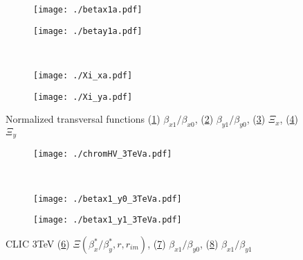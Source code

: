\begin{figure}
\begin{subfigure}{0.5\textwidth}
 \texttt{[image: ./betax1a.pdf]}\caption{}\label{figT:Bx}
 \end{subfigure}
 \begin{subfigure}{0.5\textwidth}
 \texttt{[image: ./betay1a.pdf]}\caption{}\label{figT:By}
 \end{subfigure}\\
 \begin{subfigure}{0.5\textwidth}
 \texttt{[image: ./Xi\_xa.pdf]}\caption{}\label{figT:xix}
 \end{subfigure}
 \begin{subfigure}{0.5\textwidth}
 \texttt{[image: ./Xi\_ya.pdf]}\caption{}\label{figT:xiy}
 \end{subfigure}
 \caption{Normalized transversal functions (\ref{figT:Bx}) $\beta_{x1}/\beta_{x0}$, (\ref{figT:By}) $\beta_{y1}/\beta_{y0}$, (\ref{figT:xix}) $\Xi_x$, (\ref{figT:xiy}) $\Xi_y$}\label{f:figT}
\end{figure}
\begin{figure}
\begin{subfigure}{1.0\textwidth}
 \texttt{[image: ./chromHV\_3TeVa.pdf]}\caption{}\label{fig_3TeV:chrom}
 \end{subfigure}\\
 \begin{subfigure}{0.5\textwidth}
 \texttt{[image: ./betax1\_y0\_3TeVa.pdf]}\caption{}\label{fig_3TeV:bx1_y0}
 \end{subfigure}
  \begin{subfigure}{0.5\textwidth}
 \texttt{[image: ./betax1\_y1\_3TeVa.pdf]}\caption{}\label{fig_3TeV:bx1_y1}
 \end{subfigure}
 \caption{CLIC 3TeV (\ref{fig_3TeV:chrom}) $\Xi(\beta^*_x/\beta^*_y,r,r_{im})$, (\ref{fig_3TeV:bx1_y0}) $\beta_{x1}/\beta_{y0}$, (\ref{fig_3TeV:bx1_y1}) $\beta_{x1}/\beta_{y1}$}\label{f:fig_3TeV}
\end{figure}
